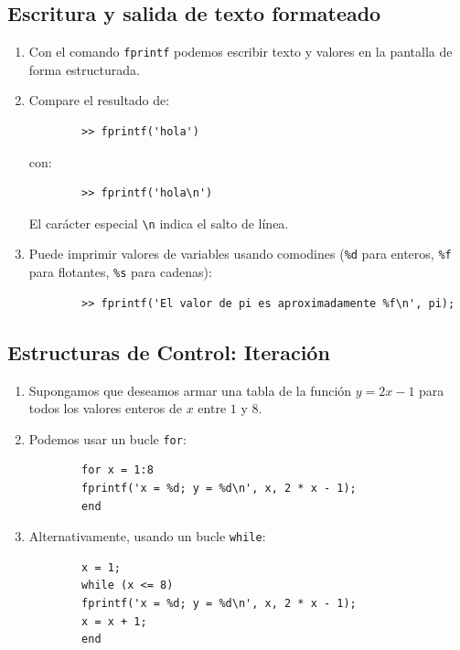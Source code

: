 \documentclass[11pt,a4paper,openany]{book}
\begin{document}
\subsection{Escritura y salida de texto formateado}

\begin{enumerate}
	\item Con el comando \texttt{fprintf} podemos escribir texto y valores en la pantalla de forma estructurada.
	
	\item Compare el resultado de:
	\begin{verbatim}
		>> fprintf('hola')
	\end{verbatim}
	con:
	\begin{verbatim}
		>> fprintf('hola\n')
	\end{verbatim}
	El carácter especial \verb-\n- indica el salto de línea.
	
	\item Puede imprimir valores de variables usando comodines (\texttt{\%d} para enteros, \texttt{\%f} para flotantes, \texttt{\%s} para cadenas):
	\begin{verbatim}
		>> fprintf('El valor de pi es aproximadamente %f\n', pi);
	\end{verbatim}
\end{enumerate}

\subsection{Estructuras de Control: Iteración}

\begin{enumerate}
	\item Supongamos que deseamos armar una tabla de la función $y = 2x - 1$ para todos los valores enteros de $x$ entre $1$ y $8$.
	
	\item Podemos usar un bucle \texttt{for}:
	\begin{verbatim}
		for x = 1:8
		fprintf('x = %d; y = %d\n', x, 2 * x - 1);
		end
	\end{verbatim}
	
	\item Alternativamente, usando un bucle \texttt{while}:
	\begin{verbatim}
		x = 1;
		while (x <= 8)
		fprintf('x = %d; y = %d\n', x, 2 * x - 1);
		x = x + 1; 
		end
	\end{verbatim}
\end{enumerate}
\end{document}
